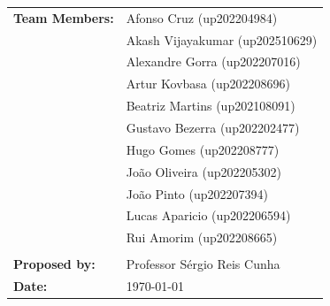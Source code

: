 \begin{titlepage}
    \begin{tabular}{ll}
        \textbf{Team Members:} & Afonso Cruz       (up202204984)\\
                               & Akash Vijayakumar (up202510629)\\
                               & Alexandre Gorra   (up202207016)\\
                               & Artur Kovbasa     (up202208696)\\
                               & Beatriz Martins   (up202108091)\\
                               & Gustavo Bezerra   (up202202477)\\
                               & Hugo Gomes        (up202208777)\\
                               & João Oliveira     (up202205302)\\
                               & João Pinto        (up202207394)\\
                               & Lucas Aparicio    (up202206594)\\
                               & Rui Amorim        (up202208665)\\
                               & \\
        \textbf{Proposed by:}   & Professor Sérgio Reis Cunha \\
        \textbf{Date:}          & \today
    \end{tabular}
\end{titlepage}
